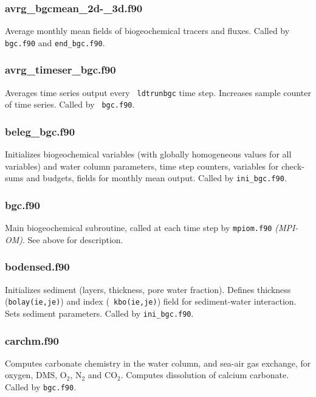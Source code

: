 \documentclass[11pt,a4paper,fleqn,twoside]{article}
\begin{document}
\subsubsection{avrg\_bgcmean\_2d-\_3d.f90} Average monthly mean fields of
biogeochemical tracers and fluxes. Called by {\tt bgc.f90} and {\tt end\_bgc.f90}.

\subsubsection{avrg\_timeser\_bgc.f90} Averages time series output every   {\tt
ldtrunbgc} time step. Increases sample counter of time series. Called by {\tt
bgc.f90}. 

\subsubsection{beleg\_bgc.f90} Initializes biogeochemical variables (with
globally homogeneous values for all variables) and water column parameters,
time step counters, variables for check-sums and budgets, fields for monthly
mean output. Called by {\tt ini\_bgc.f90}.

\subsubsection{bgc.f90} Main biogeochemical subroutine, called at each time
step by {\tt mpiom.f90} {\em (MPI-OM)}. See above for description.


\subsubsection{bodensed.f90} Initializes sediment (layers, thickness, pore
water fraction). Defines thickness ({\tt bolay(ie,je)}) and index ({\tt
kbo(ie,je)}) field for sediment-water interaction. Sets sediment parameters.
Called by {\tt ini\_bgc.f90}.

\subsubsection{carchm.f90} Computes carbonate chemistry in the water column,
and sea-air gas exchange, for oxygen, DMS, O$_2$, N$_2$ and CO$_2$. Computes
dissolution of calcium carbonate. Called by {\tt bgc.f90}.
\end{document}

